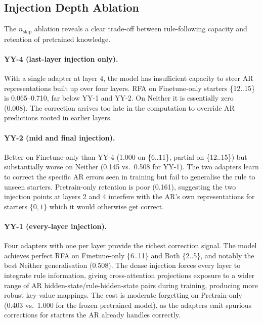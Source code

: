 \documentclass[10pt,twocolumn]{article}
\begin{document}
\subsection{Injection Depth Ablation}

The $n_\text{skip}$ ablation reveals a clear trade-off between rule-following capacity and retention of pretrained knowledge.

\paragraph{YY-4 (last-layer injection only).}
With a single adapter at layer 4, the model has insufficient capacity to steer AR representations built up over four layers. RFA on Finetune-only starters \{12..15\} is 0.065--0.710, far below YY-1 and YY-2. On Neither it is essentially zero (0.008). The correction arrives too late in the computation to override AR predictions rooted in earlier layers.

\paragraph{YY-2 (mid and final injection).}
Better on Finetune-only than YY-4 (1.000 on \{6..11\}, partial on \{12..15\}) but substantially worse on Neither (0.145 vs.\ 0.508 for YY-1). The two adapters learn to correct the specific AR errors seen in training but fail to generalise the rule to unseen starters. Pretrain-only retention is poor (0.161), suggesting the two injection points at layers 2 and 4 interfere with the AR's own representations for starters $\{0,1\}$ which it would otherwise get correct.

\paragraph{YY-1 (every-layer injection).}
Four adapters with one per layer provide the richest correction signal. The model achieves perfect RFA on Finetune-only \{6..11\} and Both \{2..5\}, and notably the best Neither generalisation (0.508). The dense injection forces every layer to integrate rule information, giving cross-attention projections exposure to a wider range of AR hidden-state/rule-hidden-state pairs during training, producing more robust key-value mappings. The cost is moderate forgetting on Pretrain-only (0.403 vs.\ 1.000 for the frozen pretrained model), as the adapters emit spurious corrections for starters the AR already handles correctly.
\end{document}
